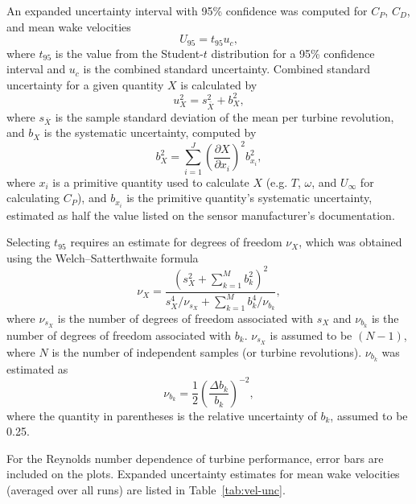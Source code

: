 \documentclass[energies,article,accept,moreauthors,pdftex,12pt,a4paper]{mdpi}
\begin{document}
An expanded uncertainty interval with 95\% confidence was computed for
$C_P$, $C_D$, and mean wake velocities
\begin{equation}
    U_{95} = t_{95} u_c,
\end{equation}
where $t_{95}$ is the value from the Student-$t$ distribution for a 95\%
confidence interval and $u_c$ is the combined standard uncertainty. Combined
standard uncertainty for a given quantity $X$ is calculated by
\begin{equation}
    u_X^2 = s_{\bar{X}}^2 + b_X^2,
\end{equation}
where $s_{\bar{X}}$ is the sample standard deviation of the mean per turbine
revolution, and $b_X$ is the systematic uncertainty, computed by
\begin{equation}
    b_{X}^2 = \sum_{i=1}^J \left( \frac{\partial X}{\partial x_i} \right)^2
    b_{x_i}^2,
\end{equation}
where $x_i$ is a primitive quantity used to calculate $X$ (e.g. $T$, $\omega$,
and $U_\infty$ for calculating $C_P$), and $b_{x_i}$ is the primitive quantity's
systematic uncertainty, estimated as half the value listed on the sensor
manufacturer's documentation.

Selecting $t_{95}$ requires an estimate for degrees of freedom $\nu_X$, which
was obtained using the Welch--Satterthwaite formula
\begin{equation}
    \nu_X = \frac{\left(s_X^2 + \sum_{k=1}^M b_k^2 \right)^2} {s_X^4/\nu_{s_X} +
    \sum_{k=1}^M b_k^4/\nu_{b_k}},
\end{equation}
where $\nu_{s_X}$ is the number of degrees of freedom associated with $s_X$ and
$\nu_{b_k}$ is the number of degrees of freedom associated with $b_k$.
$\nu_{s_X}$ is assumed to be $(N-1)$, where $N$ is the number of independent
samples (or turbine revolutions). $\nu_{b_k}$ was estimated as
\begin{equation}
    \nu_{b_k} = \frac{1}{2} \left( \frac{\Delta b_k}{b_k} \right)^{-2},
\end{equation}
where the quantity in parentheses is the relative uncertainty of $b_k$, assumed
to be 0.25.

For the Reynolds number dependence of turbine performance, error bars are
included on the plots. Expanded uncertainty estimates for mean wake velocities
(averaged over all runs) are listed in Table~\ref{tab:vel-unc}.
\end{document}
